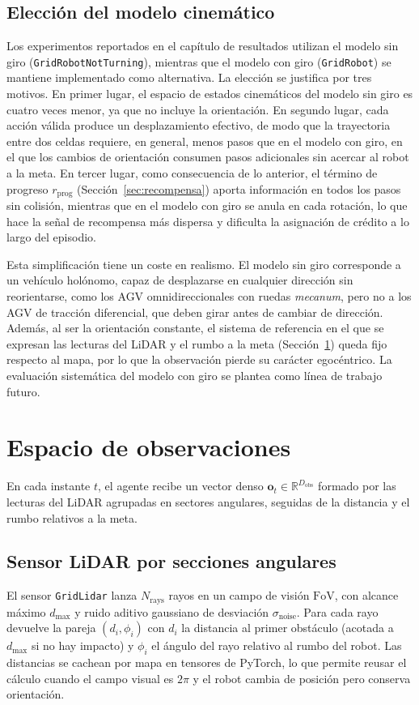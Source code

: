 \subsection{Elección del modelo cinemático}
Los experimentos reportados en el capítulo de resultados utilizan el
modelo sin giro (\texttt{GridRobotNotTurning}), mientras que el modelo con
giro (\texttt{GridRobot}) se mantiene implementado como alternativa. La
elección se justifica por tres motivos. En primer lugar, el espacio de
estados cinemáticos del modelo sin giro es cuatro veces menor, ya que no
incluye la orientación. En segundo lugar, cada acción válida produce un
desplazamiento efectivo, de modo que la trayectoria entre dos celdas
requiere, en general, menos pasos
que en el modelo con giro, en el que los cambios de orientación consumen
pasos adicionales sin acercar al robot a la meta. En tercer lugar, como
consecuencia de lo anterior, el término de progreso $r_{\text{prog}}$
(Sección~\ref{sec:recompensa}) aporta información en todos los pasos sin
colisión, mientras que en el modelo con giro se anula en cada rotación, lo
que hace la señal de recompensa más dispersa y dificulta la asignación de
crédito a lo largo del episodio.

Esta simplificación tiene un coste en realismo. El modelo sin giro
corresponde a un vehículo holónomo, capaz de desplazarse en cualquier
dirección sin reorientarse, como los AGV omnidireccionales con ruedas
\textit{mecanum}, pero no a los AGV de tracción diferencial, que deben
girar antes de cambiar de dirección. Además, al ser la orientación
constante, el sistema de referencia en el que se expresan las lecturas
del LiDAR y el rumbo a la meta (Sección~\ref{sec:observacion}) queda fijo
respecto al mapa, por lo que la observación pierde su carácter egocéntrico.
La evaluación sistemática del modelo con giro se plantea como línea de
trabajo futuro.

\section{Espacio de observaciones}\label{sec:observacion}
En cada instante $t$, el agente recibe un vector denso
$\mathbf{o}_t \in \mathbb{R}^{D_{\text{obs}}}$ formado por las lecturas del
LiDAR agrupadas en sectores angulares, seguidas de la distancia y el rumbo
relativos a la meta.

\subsection{Sensor LiDAR por secciones angulares}
El sensor \texttt{GridLidar} lanza $N_{\text{rays}}$ rayos en un campo de
visión $\text{FoV}$, con alcance máximo $d_{\max}$ y ruido aditivo
gaussiano de desviación $\sigma_{\text{noise}}$. Para cada rayo devuelve
la pareja $(d_i, \phi_i)$ con $d_i$ la distancia al primer obstáculo
(acotada a $d_{\max}$ si no hay impacto) y $\phi_i$ el ángulo del rayo
relativo al rumbo del robot. Las distancias se cachean por mapa en
tensores de PyTorch, lo que permite reusar el cálculo cuando el campo
visual es $2\pi$ y el robot cambia de posición pero conserva orientación.

